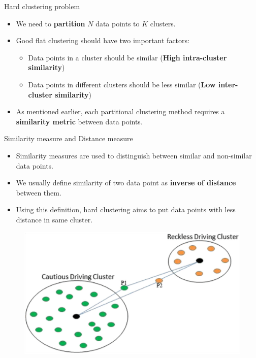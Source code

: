\documentclass[serif, aspectratio=169]{beamer}
\begin{document}
\begin{frame}{Hard clustering problem}
    \begin{itemize}
        \item We need to \textbf{partition} \( N \) data points to \( K \) clusters.
        \item Good flat clustering should have two important factors:
        \begin{itemize}
            \item Data points in a cluster should be similar (\textbf{High intra-cluster similarity})
            \item Data points in different clusters should be less similar (\textbf{Low inter-cluster similarity})
        \end{itemize}
        \item As mentioned earlier, each partitional clustering method requires a \textbf{similarity metric} between data points.
    \end{itemize}
\end{frame}

\begin{frame}{Similarity measure and Distance measure}
    \begin{minipage}{0.6\textwidth}
        \begin{itemize}
            \item Similarity measures are used to distinguish between similar and non-similar data points.
            \item We usually define similarity of two data point as \textbf{inverse of distance} between them.
            \item Using this definition, {hard clustering aims to put data points with less distance in same cluster.}
        \end{itemize}
    \end{minipage}%
    \begin{minipage}{0.35}
        \begin{figure}
            \centering
            \includegraphics[scale=0.4]{pic/Distance-based-clustering-approach.png}
        \end{figure}
    \end{minipage}
\end{frame}
\end{document}
